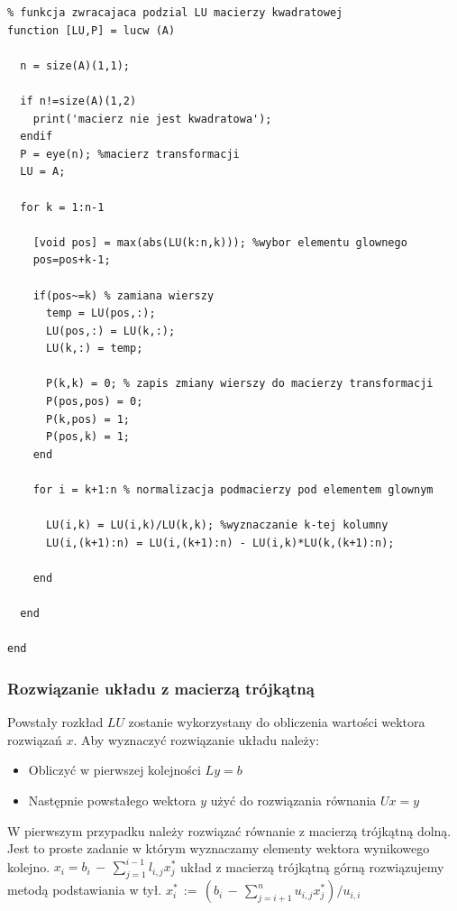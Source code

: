 \documentclass[a4paper, 11pt]{article}
\begin{document}
\begin{lstlisting}
% funkcja zwracajaca podzial LU macierzy kwadratowej
function [LU,P] = lucw (A)

  n = size(A)(1,1);
  
  if n!=size(A)(1,2) 
    print('macierz nie jest kwadratowa');
  endif
  P = eye(n); %macierz transformacji
  LU = A; 
  
  for k = 1:n-1
      
    [void pos] = max(abs(LU(k:n,k))); %wybor elementu glownego
    pos=pos+k-1;
  
    if(pos~=k) % zamiana wierszy
      temp = LU(pos,:);
      LU(pos,:) = LU(k,:);
      LU(k,:) = temp;
        
      P(k,k) = 0; % zapis zmiany wierszy do macierzy transformacji
      P(pos,pos) = 0;
      P(k,pos) = 1;
      P(pos,k) = 1;
    end
             
    for i = k+1:n % normalizacja podmacierzy pod elementem glownym
          
      LU(i,k) = LU(i,k)/LU(k,k); %wyznaczanie k-tej kolumny
      LU(i,(k+1):n) = LU(i,(k+1):n) - LU(i,k)*LU(k,(k+1):n);
      
    end
    
  end
  
end

\end{lstlisting}

\subsubsection{Rozwiązanie układu z macierzą trójkątną}

Powstały rozkład $LU$ zostanie wykorzystany do obliczenia wartości wektora rozwiązań $x$. 
Aby wyznaczyć rozwiązanie układu należy:
\begin{itemize}
\item Obliczyć w pierwszej kolejności $Ly = b$ 
\item Następnie powstałego wektora $y$ użyć do rozwiązania równania $Ux = y$
\end{itemize}
W pierwszym przypadku należy rozwiązać równanie z macierzą trójkątną dolną. Jest to proste zadanie w którym wyznaczamy elementy wektora wynikowego kolejno. $x_i = b_i\,-\,\sum_{j=1}^{i-1} l_{i,j} x_j^*$
układ z macierzą trójkątną górną rozwiązujemy metodą podstawiania w tył. $x_i^*\,:=\,\left( b_i\,-\, \sum_{j=i+1}^n u_{i,j}x_j^*\right)/u_{i,i}$\\
\end{document}

